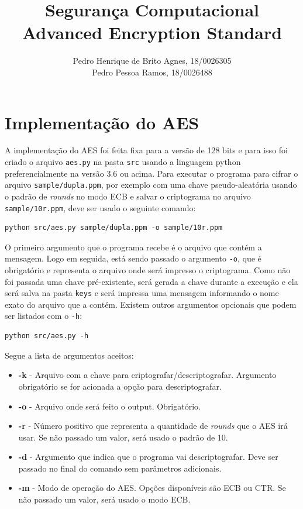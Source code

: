 \documentclass[12pt]{article}
\title{\textbf{Segurança Computacional\\ \Large{Advanced Encryption Standard}}}
\author{Pedro Henrique de Brito Agnes, 18/0026305 \\
Pedro Pessoa Ramos, 18/0026488}
\affil{Dep. Ciência da Computação - Universidade de Brasília (UnB) \vspace{-2ex}}
\date{}
\begin{document}
\maketitle

\section{Implementação do AES}
A implementação do AES foi feita fixa para a versão de 128 bits e para isso foi criado o arquivo \texttt{aes.py} na pasta \texttt{src} usando a linguagem python preferencialmente na versão 3.6 ou acima. Para executar o programa para cifrar o arquivo \texttt{sample/dupla.ppm}, por exemplo com uma chave pseudo-aleatória usando o padrão de \textit{rounds} no modo ECB e salvar o criptograma no arquivo \texttt{sample/10r.ppm}, deve ser usado o seguinte comando:

\begin{lstlisting}
python src/aes.py sample/dupla.ppm -o sample/10r.ppm
\end{lstlisting}

O primeiro argumento que o programa recebe é o arquivo que contém a mensagem. Logo em seguida, está sendo passado o argumento \texttt{-o}, que é obrigatório e representa o arquivo onde será impresso o criptograma. Como não foi passada uma chave pré-existente, será gerada a chave durante a execução e ela será salva na pasta \texttt{keys} e será impressa uma mensagem informando o nome exato do arquivo que a contém. Existem outros argumentos opcionais que podem ser listados com o \texttt{-h}:

\begin{lstlisting}
python src/aes.py -h
\end{lstlisting}

Segue a lista de argumentos aceitos:
\begin{itemize}
    \item \textbf{-k} - Arquivo com a chave para criptografar/descriptografar. Argumento obrigatório se for acionada a opção para descriptografar.
    \item \textbf{-o} - Arquivo onde será feito o output. Obrigatório.
    \item \textbf{-r} - Número positivo que representa a quantidade de \textit{rounds} que o AES irá usar. Se não passado um valor, será usado o padrão de 10.
    \item \textbf{-d} - Argumento que indica que o programa vai descriptografar. Deve ser passado no final do comando sem parâmetros adicionais.
    \item \textbf{-m} - Modo de operação do AES. Opções disponíveis são ECB ou CTR. Se não passado um valor, será usado o modo ECB.
\end{itemize}
\end{document}
